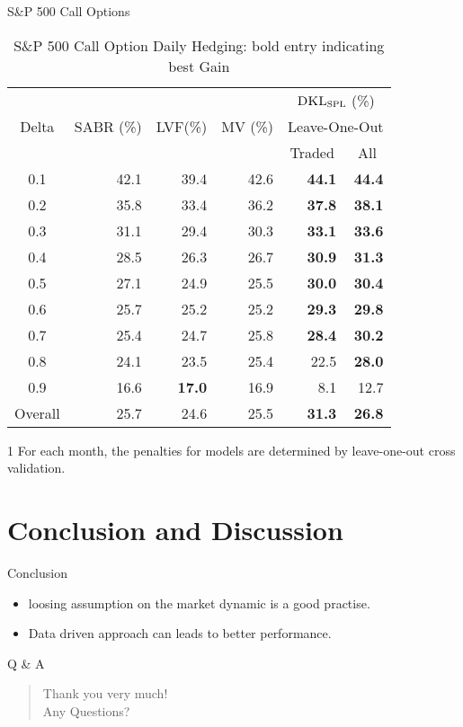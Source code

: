 \documentclass[10pt,table,mathserif]{beamer}
\newcommand{\DKLs}{\bf\textsc{DKL}_{\text{SPL}}}
\newcommand{\LVF}{\textsc{LVF}}
\begin{document}
\begin{frame}{S\&P 500 Call Options}
\begin{table}[htp!]
\centering
\begin{threeparttable}
\begin{tabular}{|c |r r r r r|}
\hline
\multirow{3}{*}{Delta}&\multirow{3}{*}{SABR (\%)}&\multirow{3}{*}{\LVF\;(\%)}&\multirow{3}{*}{MV (\%)}&\multicolumn{2}{c|}{$\DKLs$ (\%)}\\
&&&&\multicolumn{2}{c|}{\small Leave-One-Out\tnote{1} }\\
&&&&\multicolumn{1}{c}{\small Traded}&\multicolumn{1}{c|}{\small All}\\ \hline
  0.1 & 42.1 & 39.4 & 42.6 & \textbf{44.1} & \textbf{44.4}  \\
  0.2 & 35.8 & 33.4 & 36.2 & \textbf{37.8} & \textbf{38.1} \\
  0.3 & 31.1 & 29.4 & 30.3 & \textbf{33.1} & \textbf{33.6} \\
  0.4 & 28.5 & 26.3 & 26.7 & \textbf{30.9} & \textbf{31.3}   \\
  0.5 & 27.1 & 24.9 & 25.5 & \textbf{30.0}& \textbf{30.4}  \\
  0.6 & 25.7 & 25.2 & 25.2 & \textbf{29.3}& \textbf{29.8}  \\
  0.7 & 25.4 & 24.7 & 25.8 & \textbf{28.4} & \textbf{30.2}  \\
  0.8 & 24.1 & 23.5 & 25.4&   22.5& \textbf{28.0}  \\
  0.9 & 16.6 & \textbf{17.0} & 16.9 & 8.1  & 12.7  \\
  Overall & 25.7 & 24.6 & 25.5 & \textbf{31.3} & \textbf{26.8}  \\
  \hline
\end{tabular}
\caption{S\&P 500 Call Option Daily Hedging: bold entry indicating best Gain}
\label{SP500Call}
  \begin{tablenotes}
    \small
  \item[1] For each month, the penalties for models are determined by leave-one-out cross validation.
\end{tablenotes}

\end{threeparttable}

\end{table}
\end{frame}


\section{Conclusion and Discussion}
\begin{frame}{Conclusion}
\begin{itemize}
\item loosing assumption on the market dynamic is a good practise.
\item Data driven approach can leads to better performance.
\end{itemize}
\end{frame}

\begin{frame}{Q \& A}
  \LARGE
  \begin{quote}
    \alert{Thank you very much!}\\
    \hspace{8ex} Any Questions?
  \end{quote}
\end{frame}
\end{document}
